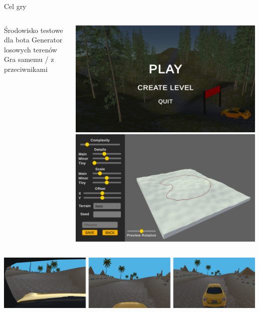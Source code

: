 \begin{frame}{Cel gry}

	\begin{columns}
		\begin{column}{.6\hsize}
			\begin{itemize}
				\myitem Środowisko testowe dla bota
				\myitem Generator losowych terenów
				\myitem Gra samemu / z przeciwnikami
			\end{itemize}
		\end{column}
		\begin{column}{.4\hsize}
			\centering
			\includegraphics[width=0.85\linewidth]{figures/game_instruction_start.png}
			\includegraphics[width=0.85\linewidth]{figures/game_instruction_create.png}
		\end{column}
	\end{columns}

	\begin{columns}
		\begin{column}{\hsize}
			\centering
			{\hspace*{-5mm}\includegraphics[width=1.05\linewidth]{figures/game_instruction_camera_switch.png}}
		\end{column}
	\end{columns}

\end{frame}
